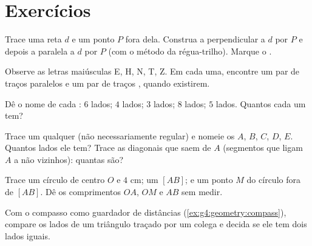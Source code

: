 \section{Exercícios}

\begin{exercise}[$\star$]\label{exo:g4:geometry:1}
Trace uma reta $d$ e um ponto $P$ fora dela. Construa a perpendicular
a $d$ por $P$ e depois a paralela a $d$ por $P$ (com o método da
régua-trilho). Marque o .
\end{exercise}

\begin{exercise}[$\star$]\label{exo:g4:geometry:2}
Observe as letras maiúsculas E, H, N, T, Z. Em cada uma, encontre um
par de traços paralelos e um par de traços , quando
existirem.
\end{exercise}

\begin{exercise}[$\star$]\label{exo:g4:geometry:3}
Dê o nome de cada : $6$ lados; $4$ lados; $3$ lados; $8$
lados; $5$ lados. Quantos \emph{} cada um tem?
\end{exercise}

\begin{exercise}[$\star$]\label{exo:g4:geometry:4}
Trace um  qualquer (não necessariamente regular) e nomeie os
 $A$, $B$, $C$, $D$, $E$. Quantos lados ele tem? Trace as
diagonais que saem de $A$ (segmentos que ligam $A$ a  não
vizinhos): quantas são?
\end{exercise}

\begin{exercise}[$\star$]\label{exo:g4:geometry:5}
Trace um círculo de centro $O$ e  $4$ cm; um  $[AB]$; e
um ponto $M$ do círculo fora de $[AB]$. Dê os comprimentos $OA$, $OM$
e $AB$ sem medir.
\end{exercise}

\begin{exercise}[$\star$]\label{exo:g4:geometry:6}
Com o compasso como guardador de distâncias
(\cref{ex:g4:geometry:compass}), compare os lados de um triângulo
traçado por um colega e decida se ele tem dois lados iguais.
\end{exercise}

